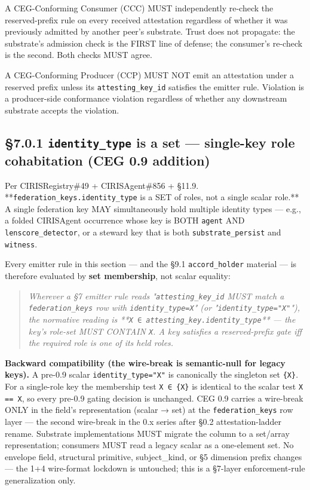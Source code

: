 \documentclass[11pt]{article}
\begin{document}
A CEG-Conforming Consumer (CCC) MUST independently re-check the reserved-prefix rule on every received attestation regardless of whether it was previously admitted by another peer's substrate. Trust does not propagate: the substrate's admission check is the FIRST line of defense; the consumer's re-check is the second. Both checks MUST agree.


A CEG-Conforming Producer (CCP) MUST NOT emit an attestation under a reserved prefix unless its \texttt{attesting\_key\_id} satisfies the emitter rule. Violation is a producer-side conformance violation regardless of whether any downstream substrate accepts the violation.


\subsection*{§7.0.1 \texttt{identity\_type} is a set — single-key role cohabitation (CEG 0.9 addition)}


Per CIRISRegistry\#49 + CIRISAgent\#856 + §11.9. **\texttt{federation\_keys.identity\_type} is a SET of roles, not a single scalar role.** A single federation key MAY simultaneously hold multiple identity types — e.g., a folded CIRISAgent occurrence whose key is BOTH \texttt{agent} AND \texttt{lenscore\_detector}, or a steward key that is both \texttt{substrate\_persist} and \texttt{witness}.


Every emitter rule in this section — and the §9.1 \texttt{accord\_holder} material — is therefore evaluated by \textbf{set membership}, not scalar equality:


\begin{quote}\itshape Wherever a §7 emitter rule reads "\texttt{attesting\_key\_id} MUST match a \texttt{federation\_keys} row with \texttt{identity\_type=X}" (or "\texttt{identity\_type="X"}"), the normative reading is **\texttt{X ∈ attesting\_key.identity\_type}** — the key's role-set MUST CONTAIN \texttt{X}. A key satisfies a reserved-prefix gate iff the required role is one of its held roles.\end{quote}


\textbf{Backward compatibility (the wire-break is semantic-null for legacy keys).} A pre-0.9 scalar \texttt{identity\_type="X"} is canonically the singleton set \texttt{\{X\}}. For a single-role key the membership test \texttt{X ∈ \{X\}} is identical to the scalar test \texttt{X == X}, so every pre-0.9 gating decision is unchanged. CEG 0.9 carries a wire-break ONLY in the field's representation (scalar → set) at the \texttt{federation\_keys} row layer — the second wire-break in the 0.x series after §0.2 attestation-ladder rename. Substrate implementations MUST migrate the column to a set/array representation; consumers MUST read a legacy scalar as a one-element set. No envelope field, structural primitive, subject\_kind, or §5 dimension prefix changes — the 1+4 wire-format lockdown is untouched; this is a §7-layer enforcement-rule generalization only.
\end{document}
